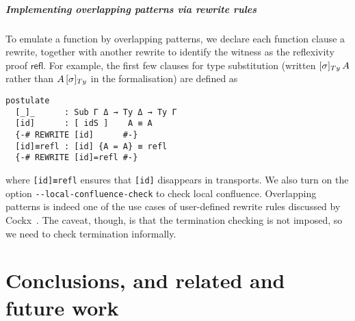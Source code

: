 \documentclass[a4paper,UKenglish,numberwithinsect,cleveref,thm-restate]{lipics-v2021}
\newcommand{\LT}[2][]{\todo[inline,author={L-T},caption={},color={pink},#1]{#2}}
\begin{document}
\subparagraph*{Implementing overlapping patterns via rewrite rules}
To emulate a function by overlapping patterns, we declare each function clause a rewrite, together with another rewrite to identify the witness as the reflexivity proof $\mathsf{refl}$.
For example, the first few clauses for type substitution (written $[\sigma]_{\Ty}\,A$ rather than $\subTy{A}{\sigma}$ in the formalisation) are defined as
\begin{lstlisting}
postulate
  [_]_      : Sub Γ Δ → Ty Δ → Ty Γ
  [id]      : [ idS ]    A ≡ A
  {-# REWRITE [id]      #-}
  [id]≡refl : [id] {A = A} ≡ refl
  {-# REWRITE [id]=refl #-}
\end{lstlisting}
where \lstinline|[id]≡refl| ensures that \lstinline|[id]| disappears in transports.
We also turn on the option \texttt{-{}-local-confluence-check}  to check local confluence.
%
Overlapping patterns is indeed one of the use cases of user-defined rewrite rules discussed by Cockx~\cite{Cockx2020}.
The caveat, though, is that the termination checking is not imposed, so we need to check termination informally.

%
% 
%

\section{Conclusions, and related and future work}\label{sec:conclusion}
\end{document}
